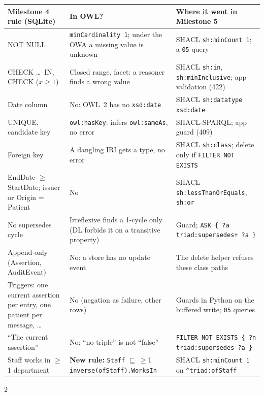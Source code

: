 \documentclass[sigconf]{acmart}
\newcommand{\tw}[1]{\texttt{#1}}
\begin{document}
\medskip\noindent
\begin{tabularx}{\linewidth}{@{}>{\raggedright\arraybackslash}p{.27\linewidth}>{\raggedright\arraybackslash}p{.36\linewidth}>{\raggedright\arraybackslash}X@{}}
\toprule
\textbf{Milestone 4 rule (SQLite)} & \textbf{In OWL?} & \textbf{Where it went in Milestone 5}\\
\midrule
NOT NULL & \tw{minCardinality 1}; under the OWA a missing value is unknown & SHACL \tw{sh:minCount 1}; a \tw{05} query\\
CHECK \dots\ IN, CHECK ($x \ge 1$) & Closed range, facet: a reasoner finds a wrong value & SHACL \tw{sh:in}, \tw{sh:minInclusive}; app validation (422)\\
Date column & No: OWL~2 has no \tw{xsd:date} & SHACL \tw{sh:datatype xsd:date}\\
UNIQUE, candidate key & \tw{owl:hasKey}: infers \tw{owl:sameAs}, no error & SHACL-SPARQL; app guard (409)\\
Foreign key & A dangling IRI gets a type, no error & SHACL \tw{sh:class}; delete only if \tw{FILTER NOT EXISTS}\\
EndDate $\ge$ StartDate; issuer or Origin = Patient & No & SHACL \tw{sh:lessThanOrEquals}, \tw{sh:or}\\
No supersedes cycle & Irreflexive finds a 1-cycle only (DL forbids it on a transitive property) & Guard; \tw{ASK \{ ?a triad:supersedes+ ?a \}}\\
Append-only (Assertion, AuditEvent) & No: a store has no update event & The delete helper refuses these class paths\\
Triggers: one current assertion per entry, one patient per message, \dots & No (negation as failure, other rows) & Guards in Python on the buffered write; \tw{05} queries\\
``The current assertion'' & No: ``no triple'' is not ``false'' & \tw{FILTER NOT EXISTS \{ ?n triad:supersedes ?a \}}\\
Staff works in $\ge$1 department & \textbf{New rule:} \tw{Staff} $\sqsubseteq\ \ge$1 \tw{inverse(ofStaff).WorksIn} & SHACL \tw{sh:minCount 1} on \tw{\^{}triad:ofStaff}\\
\bottomrule
\end{tabularx}


\medskip\normalsize
\begin{multicols}{2}


\end{multicols}
\end{document}
